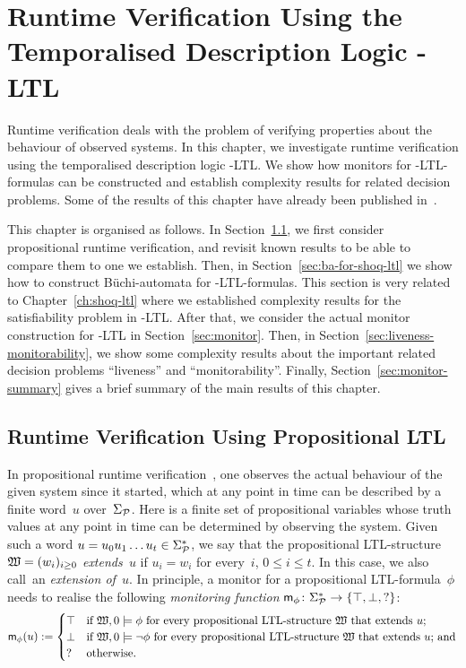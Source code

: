 \chapter[Runtime Verification Using \texorpdfstring{\SHOQ-LTL}{SHOQ-LTL}]{%
    Runtime Verification Using the Temporalised Description Logic \texorpdfstring{\SHOQ-LTL}{SHOQ-LTL}}\label{ch:monitor}

Runtime verification deals with the problem of verifying properties about the
behaviour of observed systems.
%
In this chapter, we investigate runtime verification using the temporalised
description logic \SHOQ-LTL\@.  We show how monitors for \SHOQ-LTL-formulas can
be constructed and establish complexity results for related decision problems.
%
Some of the results of this chapter have already been published
in~\cite{BaLi-LTCS-14-01}.

This chapter is organised as follows.  In Section~\ref{sec:monitor-ltl}, we
first consider propositional runtime verification, and revisit known results to
be able to compare them to one we establish.  Then, in
Section~\ref{sec:ba-for-shoq-ltl} we show how to construct Büchi-automata for
\SHOQ-LTL-formulas.  This section is very related to Chapter~\ref{ch:shoq-ltl}
where we established complexity results for the satisfiability problem in
\SHOQ-LTL\@.  After that, we consider the actual monitor construction for
\SHOQ-LTL in Section~\ref{sec:monitor}.  Then, in
Section~\ref{sec:liveness-monitorability}, we show some complexity results about
the important related decision problems \enquote{liveness} and
\enquote{monitorability}.  Finally, Section~\ref{sec:monitor-summary} gives a
brief summary of the main results of this chapter.


\section{Runtime Verification Using Propositional LTL}\label{sec:monitor-ltl}

In propositional runtime verification~\cite{BaLS-JLC10,BaLS-ToSEM11}, one
observes the actual behaviour of the given system since it started, which at any
point in time can be described by a finite word~$u$ over~$\Sigma_\mathcal{P}$.  Here
\Pmc is a finite set of propositional variables whose truth values at any point
in time can be determined by observing the system.
%
Given such a word $u=u_0u_1\dots u_t\in\Sigma_\mathcal{P}^*$, we say that the
propositional LTL-structure $\mathfrak{W}=(w_i)_{i\ge 0}$ \emph{extends~$u$} if
$u_i=w_i$ for every~$i$, $0\le i\le t$.  In this case, we also call~\Wmf an
\emph{extension of~$u$}.
%
In principle, a monitor for a propositional LTL-formula~$\phi$ needs to realise
the following \emph{monitoring function}
$\mathsf{m}_\phi\colon\Sigma_\mathcal{P}^*\to\{\top,\bot,{?}\}$:
\[\msf_\phi(u):=\begin{cases}
        \top &\text{if $\Wmf,0\models\phi$ for every propositional LTL-structure~\Wmf that extends~$u$;}\\
        \bot &\text{if $\Wmf,0\models\lnot\phi$ for every propositional LTL-structure~\Wmf that extends~$u$; and}\\
        {?}  &\text{otherwise.}
    \end{cases}\]

